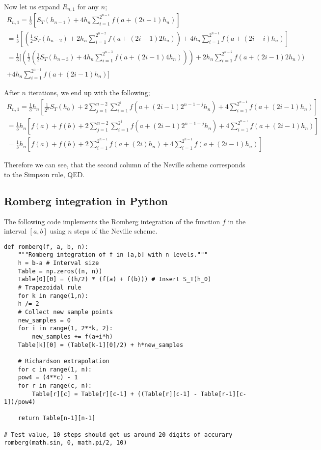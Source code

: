 \documentclass[11pt]{article}
\begin{document}
Now let us expand \(R_{n,1}\) for any \(n\);
\begin{multline}
R_{n,1} = \frac{1}{3} [ S_T(h_{n-1}) + 4h_n \sum_{i=1}^{2^{n-1}}f(a+(2i-1)h_n) ] \\
= \frac{1}{3} [ (\frac{1}{2}S_T(h_{n-2})+2h_n \sum_{i=1}^{2^{n-2}}f(a+(2i-1)2h_n)) 
  + 4 h_n \sum_{i=1}^{2^{n-1}}f(a+(2i-i)h_n) ]\\
= \frac{1}{3} [ (\frac{1}{2}(\frac{1}{2}S_T(h_{n-3})+4h_n \sum_{i=1}^{2^{n-3}}f(a+(2i-1)4h_n)
))+2h_n \sum_{i=1}^{2^{n-2}}f(a+(2i-1)2h_n)) \\ + 4 h_n \sum_{i=1}^{2^{n-1}}f(a+(2i-1)h_n) ]
\end{multline}

After \(n\) iterations, we end up with the following;
\begin{multline}
R_{n,1} = \frac{1}{3}h_n [ \frac{1}{2^n}S_T(h_0) + 2\sum_{j=1}^{n-2} \sum_{i=1}^{2^j} f(a+(2i-1)2^{n-1-j}h_n) + 4 \sum_{i=1}^{2^{n-1}}f(a+(2i-1)h_n) ]\\
= \frac{1}{3}h_n [ f(a) + f(b) + 2\sum_{j=1}^{n-2} \sum_{i=1}^{2^j} f(a+(2i-1)2^{n-1-j}h_n) + 4 \sum_{i=1}^{2^{n-1}}f(a+(2i-1)h_n) ]\\
= \frac{1}{3}h_n [ f(a) + f(b) + 2\sum_{i=1}^{2^{n-1}} f(a+ (2i) h_n) + 4 \sum_{i=1}^{2^{n-1}}f(a+(2i-1)h_n) ]
\end{multline}

Therefore we can see, that the second column of the Neville scheme corresponds to the Simpson rule, QED. 

\subsection{Romberg integration in Python}
\label{sec:orgf162e35}

The following code implements the Romberg integration of the function \(f\) 
in the interval \([a, b]\) using \(n\) steps of the Neville scheme.

\begin{verbatim}
def romberg(f, a, b, n):
    """Romberg integration of f in [a,b] with n levels."""
    h = b-a # Interval size   
    Table = np.zeros((n, n))   
    Table[0][0] = ((h/2) * (f(a) + f(b))) # Insert S_T(h_0)
    # Trapezoidal rule
    for k in range(1,n):
	h /= 2
	# Collect new sample points
	new_samples = 0
	for i in range(1, 2**k, 2):
	    new_samples += f(a+i*h)
	Table[k][0] = (Table[k-1][0]/2) + h*new_samples

    # Richardson extrapolation
    for c in range(1, n):
	pow4 = (4**c) - 1
	for r in range(c, n):
	    Table[r][c] = Table[r][c-1] + ((Table[r][c-1] - Table[r-1][c-1])/pow4) 

    return Table[n-1][n-1]

# Test value, 10 steps should get us around 20 digits of accurary
romberg(math.sin, 0, math.pi/2, 10)
\end{verbatim}
\end{document}
